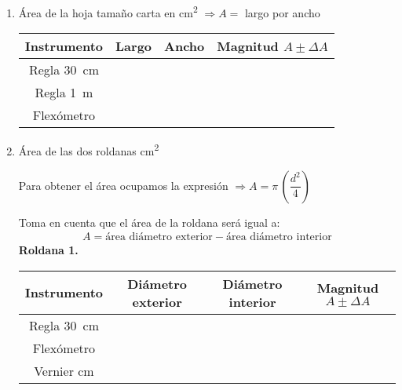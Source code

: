 \documentclass[14pt]{extarticle}
\begin{document}
\begin{enumerate}[label=\roman*)]
\item Área de la hoja tamaño carta en \unit{\square\centi\meter} \hspace{1cm} $\Rightarrow A =$ largo por ancho
\begin{table}[H]
\centering
\begin{tabular}{| c | p{3cm} | p{3cm} | c |} \hline
Instrumento & \multicolumn{1}{|c|}{Largo} & \multicolumn{1}{c|}{Ancho} & Magnitud $A \pm  \Delta A$ \\\hline
Regla \SI{30}{\centi\meter} & & & \\ \hline
Regla \SI{1}{\meter} & & & \\ \hline
Flexómetro & & & \\ \hline
\end{tabular}
\end{table}
\item Área de las dos roldanas \unit{\square\centi\meter}

Para obtener el área ocupamos la expresión $\Rightarrow A = \pi \, \left( \dfrac{d^2}{4} \right)$

Toma en cuenta que el área de la roldana será igual a:
\begin{align*}
A = \text{área diámetro exterior} - \text{área diámetro interior}
\end{align*}
\textbf{Roldana 1.}
\begin{table}[H]
\centering
\begin{tabular}{| c | c | c | c |} \hline
Instrumento & Diámetro exterior & Diámetro interior & Magnitud $A \pm  \Delta A$ \\\hline
Regla \SI{30}{\centi\meter} & & & \\ \hline
Flexómetro & & & \\ \hline
Vernier \unit{\centi\meter} & & & \\ \hline
\end{tabular}
\end{table}

\newpage


\end{enumerate}
\end{document}
